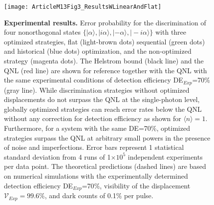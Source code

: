 \documentclass[twocolumn,pra,preprintnumbers,amsmath,amssymb,superscriptaddress,floatfix]{revtex4}%
\begin{document}
\begin{figure}[htbp]
\centering\texttt{[image: ArticleM13Fig3\_ResultsWLinearAndFlat]}
\caption{\label{ExpResults} \textbf{Experimental results.} Error
probability for the discrimination of four nonorthogonal states
$\{|\alpha\rangle, |i\alpha\rangle, |-\alpha\rangle,
|-i\alpha\rangle\}$ with three optimized strategies, flat (light-brown dots) sequential (green
dots) and historical (blue dots) optimization, and the non-optimized
strategy (magenta dots). The Helstrom bound (black line) and the QNL
(red line) are shown for reference together with the QNL with the
same experimental conditions of detection efficiency
DE$_{Exp}$=70$\%$ (gray line). While discrimination strategies
without optimized displacements do not surpass the QNL at the
single-photon level, globally optimized strategies can reach error
rates below the QNL without any correction for detection efficiency
as shown for $\langle n\rangle=1$. Furthermore, for a system with the same
DE=70$\%$, optimized strategies surpass the QNL at arbitrary small
powers in the presence of noise and imperfections. Error bars
represent 1 statistical standard deviation from 4 runs of
1$\times10^5$ independent experiments per data point. The
theoretical predictions (dashed lines) are based on numerical
simulations with the experimentally determined detection efficiency
DE$_{Exp}$=70$\%$, visibility of the displacement
$\mathcal{V}_{Exp}=99.6\%$, and dark counts of 0.1$\%$ per pulse.}
\end{figure}
\end{document}
